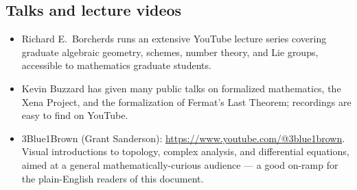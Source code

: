 \subsection*{Talks and lecture videos}

\begin{itemize}
  \item Richard E.\ Borcherds runs an extensive YouTube lecture
    series covering graduate algebraic geometry, schemes, number
    theory, and Lie groups, accessible to mathematics graduate
    students.
  \item Kevin Buzzard has given many public talks on formalized
    mathematics, the Xena Project, and the formalization of
    Fermat's Last Theorem; recordings are easy to find on YouTube.
  \item 3Blue1Brown (Grant Sanderson):
    \url{https://www.youtube.com/@3blue1brown}. Visual introductions
    to topology, complex analysis, and differential equations,
    aimed at a general mathematically-curious audience --- a good
    on-ramp for the plain-English readers of this document.
\end{itemize}
